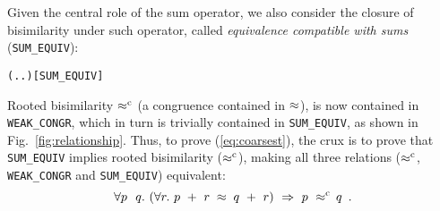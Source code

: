 Given the central role of the  
 sum operator, we also consider the closure of bisimilarity under such
 operator, called \emph{equivalence compatible with sums}
(\texttt{SUM_EQUIV}): %
\begin{alltt}
 \HOLSymConst{=} (\HOLTokenLambda{} . \HOLSymConst{\HOLTokenForall{}}.  \HOLSymConst{\ensuremath{+}}  \HOLSymConst{\HOLTokenWeakEQ}  \HOLSymConst{\ensuremath{+}} )\hfill{[SUM_EQUIV]}
\end{alltt}

%
Rooted bisimilarity $\mathrel{\approx^{\rm{c}}}$ (a congruence contained in
$\approx$), is now contained in \texttt{WEAK_CONGR},
which in turn is trivially contained in \texttt{SUM_EQUIV}, as shown
in Fig.~\ref{fig:relationship}. Thus, to prove (\ref{eq:coarsest}),
the crux is to prove that \texttt{SUM_EQUIV} implies
rooted bisimilarity ($\mathrel{\approx^{\rm{c}}}$), making all three relations
($\mathrel{\approx^{\rm{c}}}$, \texttt{WEAK_CONGR} and \texttt{SUM_EQUIV}) equivalent:
\begin{equation}
\label{equa:pq}
\forall p\ \ q.\ ( \forall r.\ p\ +\ r \;\approx\; q\ +\ r ) \
\Rightarrow\ p\ \mathrel{\approx^{\rm{c}}}\ \! q\enspace.
\end{equation}

